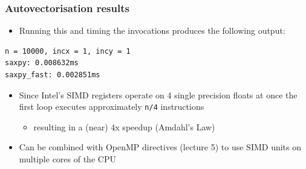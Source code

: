 \begin{Shaded}
\begin{Highlighting}[]

      
                 
     \NormalTok{)}
         \NormalTok{;}

      \NormalTok{) \{}
         \NormalTok{(} 
    \NormalTok{\}}
     \NormalTok{\{}
         \NormalTok{(} 
    \NormalTok{\}}

     \NormalTok{;}
\NormalTok{\}}
\end{Highlighting}
\end{Shaded}

\subsubsection{Autovectorisation
results}\label{autovectorisation-results}

\begin{itemize}
\itemsep1pt\parskip0pt
\item
  Running this and timing the invocations produces the following output:
\end{itemize}

\begin{verbatim}
n = 10000, incx = 1, incy = 1
saxpy: 0.008632ms
saxpy_fast: 0.002851ms
\end{verbatim}

\begin{itemize}
\itemsep1pt\parskip0pt
\item
  Since Intel's SIMD registers operate on 4 single precision floats at
  once the first loop executes approximately \texttt{n/4} instructions

  \begin{itemize}
  \itemsep1pt\parskip0pt
  \item
    resulting in a (near) 4x speedup (Amdahl's Law)
  \end{itemize}
\item
  Can be combined with OpenMP directives (lecture 5) to use SIMD units
  on multiple cores of the CPU
\end{itemize}

